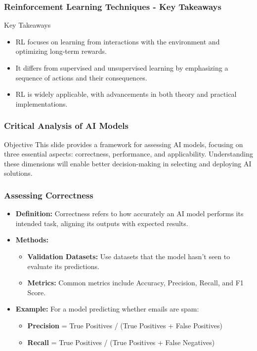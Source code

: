\documentclass[aspectratio=169]{beamer}
\begin{document}
\begin{frame}[fragile]
  \frametitle{Reinforcement Learning Techniques - Key Takeaways}
  \begin{block}{Key Takeaways}
    \begin{itemize}
      \item RL focuses on learning from interactions with the environment and optimizing long-term rewards.
      \item It differs from supervised and unsupervised learning by emphasizing a sequence of actions and their consequences.
      \item RL is widely applicable, with advancements in both theory and practical implementations.
    \end{itemize}
  \end{block}
\end{frame}

\begin{frame}[fragile]
    \frametitle{Critical Analysis of AI Models}
    \begin{block}{Objective}
        This slide provides a framework for assessing AI models, focusing on three essential aspects: correctness, performance, and applicability. Understanding these dimensions will enable better decision-making in selecting and deploying AI solutions.
    \end{block}
\end{frame}

\begin{frame}[fragile]
    \frametitle{Assessing Correctness}
    \begin{itemize}
        \item \textbf{Definition:} Correctness refers to how accurately an AI model performs its intended task, aligning its outputs with expected results.
        \item \textbf{Methods:}
        \begin{itemize}
            \item \textbf{Validation Datasets:} Use datasets that the model hasn’t seen to evaluate its predictions.
            \item \textbf{Metrics:} Common metrics include Accuracy, Precision, Recall, and F1 Score.
        \end{itemize}
        \item \textbf{Example:} For a model predicting whether emails are spam:
        \begin{itemize}
            \item \textbf{Precision} = True Positives / (True Positives + False Positives)  
            \item \textbf{Recall} = True Positives / (True Positives + False Negatives)
        \end{itemize}
    \end{itemize}
\end{frame}
\end{document}
